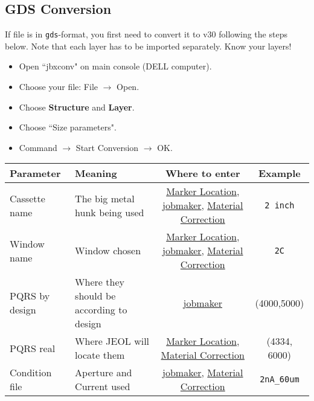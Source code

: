 \subsection{GDS Conversion}
If file  is in \texttt{gds}-format, you  first need to convert  it to
v30  following the  steps  below.  Note  that each  layer  has to  be
imported separately. Know your layers!
\begin{itemize}
\item Open ``jbxconv" on main console (DELL computer).
\item Choose your file: File $\rightarrow$ Open.
\item Choose \textbf{Structure} and \textbf{Layer}.
\item Choose ``Size parameters".
\item Command $\rightarrow$ Start Conversion $\rightarrow$ OK.
\end{itemize}

\begin{table}[htbp]
  \centering
  \begin{tabular}{|p{3cm}|p{3cm}|c|c|}
    \hline
    \textbf{Parameter} & \textbf{Meaning} & \textbf{Where to enter} & \textbf{Example}\\\hline\hline
    Cassette name & The big metal hunk being used & \hyperref[sec:marker_location]{Marker Location}, \hyperref[sec:jobmaker]{jobmaker}, \hyperref[sec:material-correction]{Material Correction} & \texttt{2 inch}\\\hline

    Window name & Window chosen  & \hyperref[sec:marker_location]{Marker Location}, \hyperref[sec:jobmaker]{jobmaker}, \hyperref[sec:material-correction]{Material Correction} & \texttt{2C}\\\hline

    PQRS by design & Where they should be according to design & \hyperref[sec:jobmaker]{jobmaker} & (4000,5000) \\\hline
    PQRS real & Where JEOL will locate them & \hyperref[sec:marker_location]{Marker Location}, \hyperref[sec:material-correction]{Material Correction} & (4334, 6000)\\\hline
    Condition file & Aperture and Current used & \hyperref[sec:jobmaker]{jobmaker}, \hyperref[sec:material-correction]{Material Correction} & \verb|2nA_60um|\\\hline
  \end{tabular}
\end{table}


